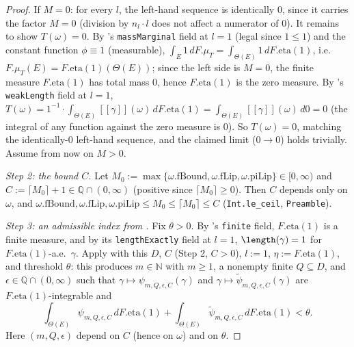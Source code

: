 \begin{proof}
  If $M=0$: for every $l$, the left-hand sequence is identically $0$, since it carries the factor
  $M=0$ (division by $n_l\cdot l$ does not affect a numerator of $0$). It remains to show
  $T(\omega)=0$. By 's \texttt{massMarginal} field at $l=1$ (legal since $1\le1$)
  and the constant function $\phi\equiv1$ (measurable), $\int_E 1\,dF.\mu_T = \int_{\Theta(E)}
  1\,dF.\mathrm{eta}(1)$, i.e.\ $F.\mu_T(E) = F.\mathrm{eta}(1)(\Theta(E))$; since the left side is
  $M=0$, the finite measure $F.\mathrm{eta}(1)$ has total mass $0$, hence $F.\mathrm{eta}(1)$ is the
  zero measure. By 's \texttt{weakLength} field at $l=1$, $T(\omega) = 1^{-1}\cdot
  \int_{\Theta(E)}[[\gamma]](\omega)\,dF.\mathrm{eta}(1) = \int_{\Theta(E)}[[\gamma]](\omega)\,d0 =
  0$ (the integral of any function against the zero measure is $0$). So $T(\omega)=0$, matching the
  identically-$0$ left-hand sequence, and the claimed limit ($0\to0$) holds trivially. Assume from
  now on $M>0$.

  \emph{Step 2: the bound $C$.} Let $M_0 := \max\{\omega.\mathrm{fBound},\omega.\mathrm{fLip},
  \omega.\mathrm{piLip}\}\in[0,\infty)$ and $C := \lceil M_0\rceil+1\in\mathbb{Q}\cap(0,\infty)$
  (positive since $\lceil M_0\rceil\ge0$). Then $C$ depends only on $\omega$, and
  $\omega.\mathrm{fBound},\omega.\mathrm{fLip},\omega.\mathrm{piLip}\le M_0\le\lceil M_0\rceil\le C$
  (\texttt{Int.le\_ceil}, \texttt{Preamble}).

  \emph{Step 3: an admissible index from .} Fix $\theta>0$. By
  's \texttt{finite} field, $F.\mathrm{eta}(1)$ is a finite measure, and by its
  \texttt{lengthExactly} field at $l=1$, $\length(\gamma)=1$ for $F.\mathrm{eta}(1)$-a.e.\
  $\gamma$. Apply  with this $D$, $C$ (Step 2, $C>0$), $l:=1$,
  $\eta:=F.\mathrm{eta}(1)$, and threshold $\theta$: this produces $m\in\mathbb{N}$ with $m\ge1$, a
  nonempty finite $Q\subseteq D$, and $\epsilon\in\mathbb{Q}\cap(0,\infty)$ such that
  $\gamma\mapsto\psi_{m,Q,\epsilon,C}(\gamma)$ and $\gamma\mapsto\tilde\psi_{m,Q,\epsilon,C}(\gamma)$
  are $F.\mathrm{eta}(1)$-integrable and
  \[
    \int_{\Theta(E)}\psi_{m,Q,\epsilon,C}\,dF.\mathrm{eta}(1)
    + \int_{\Theta(E)}\tilde\psi_{m,Q,\epsilon,C}\,dF.\mathrm{eta}(1)
    < \theta
    . \tag{3.1}
  \]
  Here $(m,Q,\epsilon)$ depend on $C$ (hence on $\omega$) and on $\theta$.


\end{proof}
